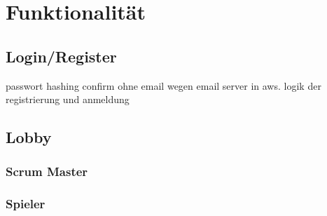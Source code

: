 \section{Funktionalität}\label{sec:funktionalität}

\subsection{Login/Register}\label{subsec:login/register}
passwort hashing
confirm ohne email wegen email server in aws.
logik der registrierung und anmeldung

\subsection{Lobby}\label{subsec:lobby}

\subsubsection{Scrum Master}
\subsubsection{Spieler}